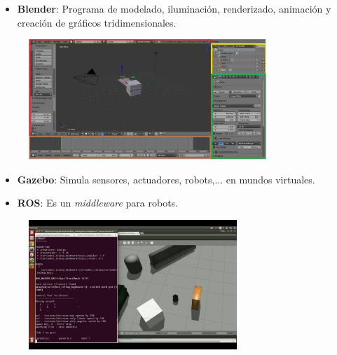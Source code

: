 \documentclass[notes,slidesec,a4]{seminar}
\begin{document}
\begin{hslide}
	\begin{itemize}
		\item \textbf{Blender}: Programa de modelado, iluminación, renderizado, animación y creación de gráficos tridimensionales.
	\end{itemize}
	\begin{center}
		\begin{figure}
			\includegraphics[width=0.8\textwidth]{InterfazBlender01.png}
		\end{figure}
	\end{center}
\end{hslide}

\begin{hslide}
	\begin{itemize}
		\item \textbf{Gazebo}: Simula sensores, actuadores, robots,... en mundos virtuales.
		\item \textbf{ROS}: Es un \textit{middleware} para robots.
	\end{itemize}
	\begin{center}
		\begin{figure}
			\includegraphics[width=0.7\textwidth]{ros.png}
		\end{figure}
	\end{center}
\end{hslide}
\end{document}
